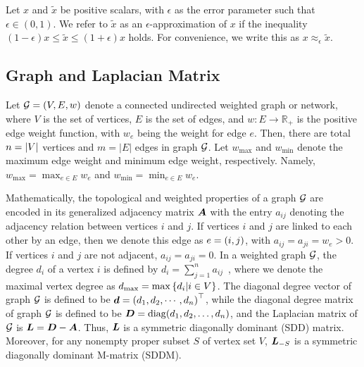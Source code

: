 \documentclass[10pt,twocolumn,twoside]{IEEEtran}
\begin{document}



\begin{definition}
    Let \(x\) and \(\tilde{x}\) be positive scalars, with \(\epsilon\) as the error parameter such that \(\epsilon\in(0,1)\). We refer to \(\tilde{x}\) as an \(\epsilon\)-approximation of \(x\) if the inequality \((1-\epsilon)x\le \tilde{x}\le(1+\epsilon)x\) holds. For convenience, we write this as \(x\approx_{\epsilon}\tilde{x}\).
\end{definition}



\subsection{Graph and Laplacian Matrix}\label{sub:lap}

Let \(\mathcal{G}=(V,E,w)\) denote a connected undirected weighted graph or network,  where \(V\) is the set of vertices,  \(E\) is the set of edges, and  \(w: E\to \mathbb{R}_{+}\) is the positive edge weight function, with \(w_e\) being the weight for edge \(e\). Then, there are total \(n=\left|V \right|\) vertices and \(m=|E|\) edges in graph \(\mathcal{G}\). Let \(w_{\max}\) and \(w_{\min}\) denote the maximum edge weight and minimum edge weight, respectively. Namely, \(w_{\max}=\max_{e\in E} w_e \) and \(w_{\min}=\min_{e\in E} w_e\).

Mathematically, the topological and weighted properties of a graph \(\mathcal{G}\) are encoded in its generalized adjacency matrix \(\boldsymbol{A}\) with the entry \(a_{ij}\) denoting the adjacency relation between vertices \(i\) and \(j\). If vertices \(i\) and \(j\) are linked to each other by an edge, then we denote this edge as \(e=\left( i,j \right)\), with \(a_{ij}= a_{ji}=w_{e}> 0\). If vertices \(i\) and \(j\) are not adjacent, \(a_{ij}=a_{ji}=0\). In a weighted graph \(\mathcal{G}\), the degree \(d_i\) of a vertex \(i\) is defined by \(d_i=\sum_{j=1}^n a_{ij}\)~\cite{BaBaPaVe04}, where we denote the maximal vertex degree as \(d_{\max}=\max\left\{d_i|i\in V \right\}\).
The diagonal degree vector of graph \(\mathcal{G}\) is defined to be \(\boldsymbol{d}=\left( d_1,d_2,\cdots,d_n \right)^\top\), while the diagonal degree matrix of graph \(\mathcal{G}\) is defined to be \({\boldsymbol{D}} = {\rm diag}(d_1, d_2, \ldots, d_n)\), and the Laplacian matrix of \(\mathcal{G}\) is \({\boldsymbol{L}}={\boldsymbol{D}}-{\boldsymbol{A}}\). Thus, \(\boldsymbol{L}\)  is a symmetric diagonally dominant (SDD) matrix. Moreover, for
any  nonempty  proper subset  \(S \) of vertex set $V$, \(\boldsymbol{L}_{-S}\) is a symmetric diagonally dominant M-matrix (SDDM).
\end{document}
